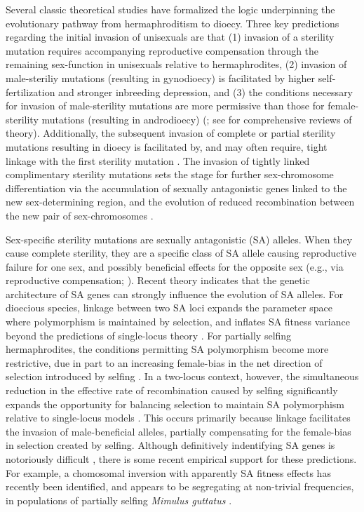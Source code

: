 \documentclass[9pt,twocolumn,twoside,lineno]{gsajnl}
\begin{document}
Several classic theoretical studies have formalized the logic underpinning the evolutionary pathway from hermaphroditism to dioecy. Three key predictions regarding the initial invasion of unisexuals are that (1) invasion of a sterility mutation requires accompanying reproductive compensation through the remaining sex-function in unisexuals relative to hermaphrodites, (2) invasion of male-steriliy mutations (resulting in gynodioecy) is facilitated by higher self-fertilization and stronger inbreeding depression, and (3) the conditions necessary for invasion of male-sterility mutations are more permissive than those for female-sterility mutations (resulting in androdioecy) (\citealt{Lewis1941,Lloyd1975,Lloyd1976,Charlesworth1978a}; see \citealt{Charlesworth1999,Charlesworth2006} for comprehensive reviews of theory). Additionally, the subsequent invasion of complete or partial sterility mutations resulting in dioecy is facilitated by, and may often require, tight linkage with the first sterility mutation \citep{Charlesworth1978a}. The invasion of tightly linked complimentary sterility mutations sets the stage for further sex-chromosome differentiation via the accumulation of sexually antagonistic genes linked to the new sex-determining region, and the evolution of reduced recombination between the new pair of sex-chromosomes \citep{Rice1987,Bachtrog2006,Charlesworth2002,Qiuetal2013}. 

Sex-specific sterility mutations are sexually antagonistic (SA) alleles. When they cause complete sterility, they are a specific class of SA allele causing reproductive failure for one sex, and possibly beneficial effects for the opposite sex (e.g., via reproductive compensation; \citealt{Lewis1941,Lloyd1975,Charlesworth1978a}). Recent theory indicates that the genetic architecture of SA genes can strongly influence the evolution of SA alleles. For dioecious species, linkage between two SA loci expands the parameter space where polymorphism is maintained by selection, and inflates SA fitness variance beyond the predictions of single-locus theory \citep{Kidwell1977,Patten2010,UbedaPatten2010}. For partially selfing hermaphrodites, the conditions permitting SA polymorphism become more restrictive, due in part to an increasing female-bias in the net direction of selection introduced by selfing \citep{JordanConnallon2014}. In a two-locus context, however, the simultaneous reduction in the effective rate of recombination caused by selfing significantly expands the opportunity for balancing selection to maintain SA polymorphism relative to single-locus models \citep{Olito2017}. This occurs primarily because linkage facilitates the invasion of male-beneficial alleles, partially compensating for the female-bias in selection created by selfing. Although definitively indentifying SA genes is notoriously difficult \citep{ConnallonClark2012,Barson2015}, there is some recent empirical support for these predictions. For example, a chomosomal inversion with apparently SA fitness effects has recently been identified, and appears to be segregating at non-trivial frequencies, in populations of partially selfing \textit{Mimulus guttatus} \citep{LeeKelly2015}.
\end{document}
